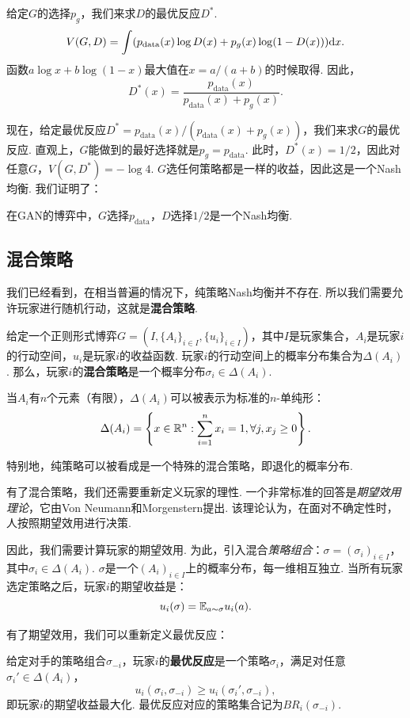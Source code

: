 给定$G$的选择$p_g$，我们来求$D$的最优反应$D^*$.
    \[V(G,D)=\int (p_{\text{data}}(x)\log D(x)+p_g(x)\log(1-D(x)))\mathrm{d} x.\]
函数$a\log x+b\log(1-x)$最大值在$x=a/(a+b)$的时候取得. 因此，
    \[D^*(x)=\frac{p_{\text{data}}(x)}{p_{\text{data}}(x)+p_g(x)}.\]
    
现在，给定最优反应$D^*=p_{\text{data}}(x)/(p_{\text{data}}(x)+p_g(x))$，我们来求$G$的最优反应. 直观上，$G$能做到的最好选择就是$p_g=p_{\text{data}}$. 此时，$D^*(x)=1/2$，因此对任意$G$，$V(G,D^*)=-\log 4$. $G$选任何策略都是一样的收益，因此这是一个Nash均衡. 我们证明了：
\begin{theorem}[GAN的Nash均衡存在性]
在GAN的博弈中，$G$选择$p_{\text{data}}$，$D$选择$1/2$是一个Nash均衡.
\end{theorem}

\subsection{混合策略}\label{sec:mixed-strategy}
我们已经看到，在相当普遍的情况下，纯策略Nash均衡并不存在. 所以我们需要允许玩家进行随机行动，这就是\textbf{混合策略}. 

\begin{definition}[混合策略]
给定一个正则形式博弈$G=(I,\{A_i\}_{i\in I},\{u_i\}_{i\in I})$，其中$I$是玩家集合，$A_i$是玩家$i$的行动空间，$u_i$是玩家$i$的收益函数. 玩家$i$的行动空间上的概率分布集合为$\Delta(A_i)$. 那么，玩家$i$的\textbf{混合策略}是一个概率分布$\sigma_i\in\Delta(A_i)$. 
\end{definition}

当$A_i$有$n$个元素（有限），$\Delta(A_i)$可以被表示为标准的$n$-单纯形：
    \[\Delta(A_i)=\left\{x\in\mathbb{R}^n:\sum_{i=1}^n x_i=1,\forall j,x_j\geq 0\right\}.\]

特别地，纯策略可以被看成是一个特殊的混合策略，即退化的概率分布.

有了混合策略，我们还需要重新定义玩家的理性. 一个非常标准的回答是\textit{期望效用理论}，它由Von Neumann和Morgenstern提出. 该理论认为，在面对不确定性时，人按照期望效用进行决策. 


因此，我们需要计算玩家的期望效用. 为此，引入混合\textit{策略组合}：$\sigma=(\sigma_i)_{i\in I}$，其中$\sigma_i\in\Delta(A_i)$. $\sigma$是一个$(A_i)_{i\in I}$上的概率分布，每一维相互独立. 当所有玩家选定策略之后，玩家$i$的期望收益是：
    \[u_i(\sigma)=\mathbb{E}_{a\sim\sigma} u_i(a).\]

有了期望效用，我们可以重新定义最优反应：

\begin{definition}[最优反应]
给定对手的策略组合$\sigma_{-i}$，玩家$i$的\textbf{最优反应}是一个策略$\sigma_i$，满足对任意$\sigma_i'\in \Delta(A_i)$，
    \[u_i(\sigma_i,\sigma_{-i})\geq u_i(\sigma_i',\sigma_{-i}),\]
即玩家$i$的期望收益最大化. 最优反应对应的策略集合记为$BR_i(\sigma_{-i})$.
\end{definition}

